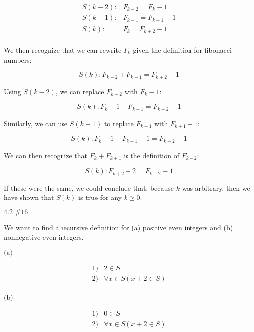 \documentclass{article}
\newcommand{\problem}[2]{$\boxed{\text{#1 \##2}}$}
\newcommand{\subproblem}[1]{$\boxed{\text{(#1)}}$}
\newcommand{\multistep}[1]{\begin{array}{rl} #1 \end{array}}
\begin{document}
\[
\multistep{
S(k-2):&F_{k-2}=F_{k}-1 \\
S(k-1):&F_{k-1}=F_{k+1}-1 \\
S(k):&F_{k}=F_{k+2}-1 \\
}
\]

We then recognize that we can rewrite $F_k$ given the definition for
fibonacci numbers:

\[
S(k):F_{k-2}+F_{k-1}=F_{k+2}-1
\]

Using $S(k-2)$, we can replace $F_{k-2}$ with $F_{k}-1$:

\[
S(k):F_{k}-1+F_{k-1}=F_{k+2}-1
\]

Similarly, we can use $S(k-1)$ to replace $F_{k-1}$ with $F_{k+1}-1$:

\[
S(k):F_k-1+F_{k+1}-1=F_{k+2}-1
\]

We can then recognize that $F_k+F_{k+1}$ is the definition of
$F_{k+2}$:

\[
S(k):F_{k+2}-2=F_{k+2}-1
\]

If these were the same, we could conclude that, because $k$ was
arbitrary, then we have shown that $S(k)$ is true for any $k\ge0$.

%
\problem{4.2}{16}

We want to find a recursive definition for (a) positive even integers
and (b) nonnegative even integers.

%
\subproblem{a}

\[
\multistep{
1) & 2\in S \\
2) & \forall x\in S(x+2\in S) \\
}
\]

%
\subproblem{b}

\[
\multistep{
1) & 0\in S \\
2) & \forall x\in S(x+2\in S) \\
}
\]
\end{document}
